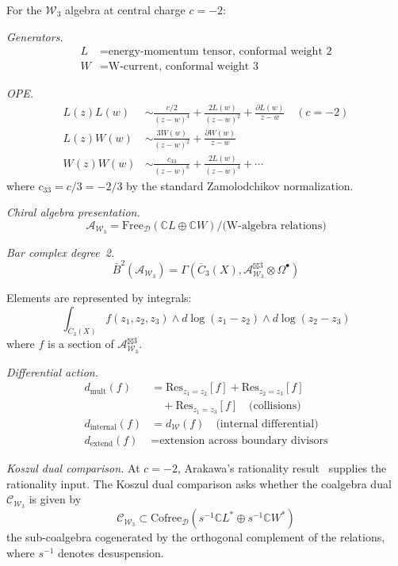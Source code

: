 \begin{example}[Explicit: \texorpdfstring{$\mathcal{W}_3$}{W_3} at \texorpdfstring{$c = -2$}{c = -2}]\label{ex:w3-c-minus-2-explicit}
For the $\mathcal{W}_3$ algebra at central charge $c = -2$:

\emph{Generators.}
\begin{align*}
L &= \text{energy-momentum tensor, conformal weight 2} \\
W &= \text{W-current, conformal weight 3}
\end{align*}

\emph{OPE.}
\begin{align*}
L(z)L(w) &\sim \frac{c/2}{(z-w)^4} + \frac{2L(w)}{(z-w)^2} + \frac{\partial L(w)}{z-w} \quad (c = -2) \\
L(z)W(w) &\sim \frac{3W(w)}{(z-w)^2} + \frac{\partial W(w)}{z-w} \\
W(z)W(w) &\sim \frac{c_{33}}{(z-w)^6} + \frac{2L(w)}{(z-w)^4} + \cdots
\end{align*}
where $c_{33} = c/3 = -2/3$ by the standard Zamolodchikov normalization.

\emph{Chiral algebra presentation.}
\[\mathcal{A}_{\mathcal{W}_3} = \text{Free}_{\mathcal{D}}(\mathbb{C}L \oplus \mathbb{C}W)
/ \text{(W-algebra relations)}\]

\emph{Bar complex degree~2.}
\[\bar{B}^2(\mathcal{A}_{\mathcal{W}_3}) = \Gamma\left(\overline{C}_3(X),
\mathcal{A}_{\mathcal{W}_3}^{\boxtimes 3} \otimes \Omega^\bullet\right)\]

Elements are represented by integrals:
\[\int_{\overline{C}_3(X)} f(z_1, z_2, z_3) \wedge d\log(z_1-z_2) \wedge d\log(z_2-z_3)\]
where $f$ is a section of $\mathcal{A}_{\mathcal{W}_3}^{\boxtimes 3}$.

\emph{Differential action.}
\begin{align*}
d_{\text{mult}}(f) &= \text{Res}_{z_1 = z_2}[f] + \text{Res}_{z_2 = z_3}[f] \\
&\quad + \text{Res}_{z_1 = z_3}[f] \quad \text{(collisions)} \\
d_{\text{internal}}(f) &= d_{\mathcal{W}}(f) \quad \text{(internal differential)} \\
d_{\text{extend}}(f) &= \text{extension across boundary divisors}
\end{align*}

\emph{Koszul dual comparison.} At $c = -2$, Arakawa's rationality
result~\cite{Ara07} supplies the rationality input. The Koszul dual
comparison asks whether the coalgebra dual $\mathcal{C}_{\mathcal{W}_3}$
is given by
\[\mathcal{C}_{\mathcal{W}_3} \subset \text{Cofree}_{\mathcal{D}}(s^{-1}\mathbb{C}L^* \oplus s^{-1}\mathbb{C}W^*)\]
the sub-coalgebra cogenerated by the orthogonal complement of the relations, where $s^{-1}$ denotes desuspension.
\end{example}

